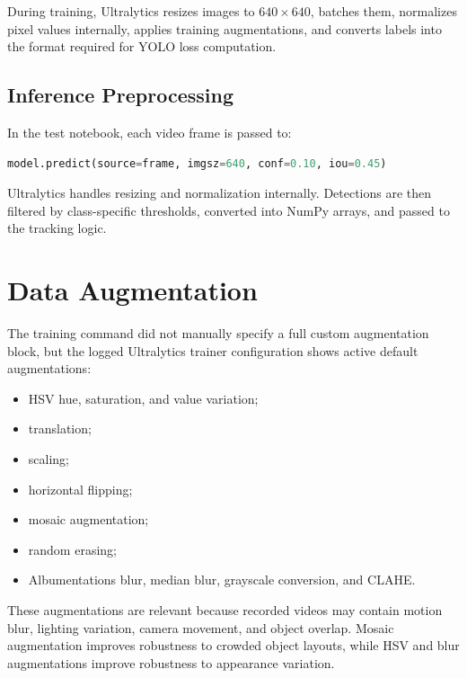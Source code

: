 \documentclass[12pt,a4paper]{article}
\begin{document}
During training, Ultralytics resizes images to \(640\times640\), batches them, normalizes pixel values internally, applies training augmentations, and converts labels into the format required for YOLO loss computation.

\subsection{Inference Preprocessing}

In the test notebook, each video frame is passed to:
\begin{lstlisting}[language=Python]
model.predict(source=frame, imgsz=640, conf=0.10, iou=0.45)
\end{lstlisting}

Ultralytics handles resizing and normalization internally. Detections are then filtered by class-specific thresholds, converted into NumPy arrays, and passed to the tracking logic.

\section{Data Augmentation}

The training command did not manually specify a full custom augmentation block, but the logged Ultralytics trainer configuration shows active default augmentations:
\begin{itemize}[noitemsep]
    \item HSV hue, saturation, and value variation;
    \item translation;
    \item scaling;
    \item horizontal flipping;
    \item mosaic augmentation;
    \item random erasing;
    \item Albumentations blur, median blur, grayscale conversion, and CLAHE.
\end{itemize}

These augmentations are relevant because recorded videos may contain motion blur, lighting variation, camera movement, and object overlap. Mosaic augmentation improves robustness to crowded object layouts, while HSV and blur augmentations improve robustness to appearance variation.

\end{document}
